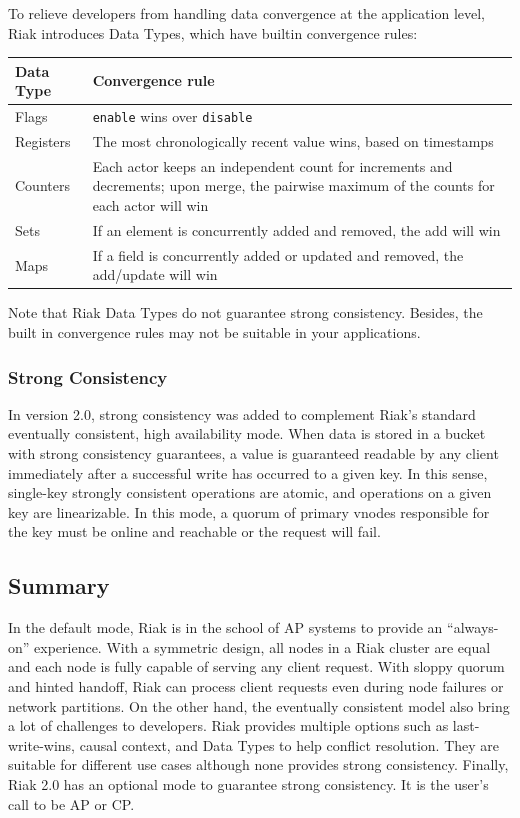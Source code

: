 \documentclass[11pt]{book}
\begin{document}
To relieve developers from handling data convergence at the application level, Riak introduces Data Types, which have builtin convergence rules: 

\begin{center}
\begin{tabular}{ l p{3in} }
\hline
\textbf{Data Type} & \textbf{Convergence rule} \\
\hline
Flags	& \texttt{enable} wins over \texttt{disable} \\
Registers	& The most chronologically recent value wins, based on timestamps \\
Counters	& Each actor keeps an independent count for increments and decrements; upon merge, the pairwise maximum of the counts for each actor will win \\
Sets	        & If an element is concurrently added and removed, the add will win \\
Maps       & If a field is concurrently added or updated and removed, the add/update will win \\
\hline
\end{tabular}
\end{center}

Note that Riak Data Types do not guarantee strong consistency. Besides, the built in convergence rules may not be suitable in your applications. 

\subsubsection{Strong Consistency}
In version 2.0, strong consistency was added to complement Riak's standard eventually consistent, high availability mode. When data is stored in a bucket with strong consistency guarantees, a value is guaranteed readable by any client immediately after a successful write has occurred to a given key. In this sense, single-key strongly consistent operations are atomic, and operations on a given key are linearizable. In this mode, a quorum of primary vnodes responsible for the key must be online and reachable or the request will fail.

\subsection{Summary}
In the default mode, Riak is in the school of AP systems to provide an ``always-on'' experience. With a symmetric design, all nodes in a Riak cluster are equal and each node is fully capable of serving any client request. With sloppy quorum and hinted handoff, Riak can process client requests even during node failures or network partitions. On the other hand, the eventually consistent model also bring a lot of challenges to developers. Riak provides multiple options such as last-write-wins, causal context, and Data Types to help conflict resolution. They are suitable for different use cases although none provides strong consistency. Finally, Riak 2.0 has an optional mode to guarantee strong consistency. It is the user's call to be AP or CP.
\end{document}

